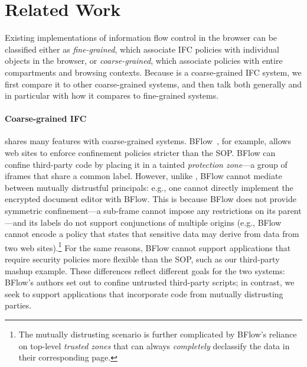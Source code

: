 \section{Related Work}
\label{sec:related}

Existing implementations of information flow control in the browser can
be classified either as \emph{fine-grained}, which associate IFC
policies with individual objects in the browser, or
\emph{coarse-grained}, which associate policies with
entire compartments and browsing contexts.  Because \sys{} is a
coarse-grained IFC system, we first compare it to other coarse-grained
systems, and then talk both generally and in particular with how
it compares to fine-grained systems.

\paragraph{Coarse-grained IFC} \sys{} shares many features
with coarse-grained systems.
%
BFlow~\cite{Yip:2009:PBS}, for example, allows web sites to enforce confinement policies
stricter than the SOP\@.
%
BFlow can confine third-party code by placing
it in a tainted \emph{protection zone}---a group
of iframes that share a common label.
%
However, unlike \sys{}, BFlow cannot mediate between mutually
distrustful principals: e.g., one cannot directly implement the
encrypted document editor with BFlow.
%
This is because BFlow does not provide symmetric confinement---a
sub-frame cannot impose any restrictions on its parent---and its
labels do not support conjunctions of multiple origins (e.g., BFlow
cannot encode a policy that states that sensitive data may derive from
data from two web sites).\footnote{ The mutually distrusting scenario
  is further complicated by BFlow's reliance on top-level
  \emph{trusted zones} that can always \emph{completely} declassify
  the data in their corresponding page.}
%
For the same reasons, BFlow cannot support applications that require
security policies more flexible than the SOP, such as our third-party
mashup example.
%
These differences reflect different goals for the two systems: BFlow's
authors set out to confine untrusted third-party scripts; in contrast,
we seek to support applications that incorporate code from mutually
distrusting parties.


